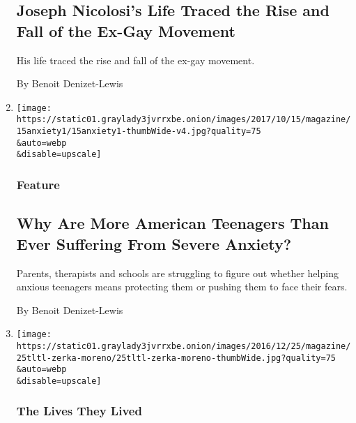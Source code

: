 \begin{enumerate}
  \hypertarget{joseph-nicolosis-life-traced-the-rise-and-fall-of-the-ex-gay-movement}{%
  \subsection{Joseph Nicolosi's Life Traced the Rise and Fall of the
  Ex-Gay
  Movement}\label{joseph-nicolosis-life-traced-the-rise-and-fall-of-the-ex-gay-movement}}

  His life traced the rise and fall of the ex-gay movement.

  By Benoit Denizet-Lewis
\item
  \href{/2017/10/11/magazine/why-are-more-american-teenagers-than-ever-suffering-from-severe-anxiety.html}{}

  \texttt{[image: https://static01.graylady3jvrrxbe.onion/images/2017/10/15/magazine/15anxiety1/15anxiety1-thumbWide-v4.jpg?quality=75\\\&auto=webp\\\&disable=upscale]}

  \hypertarget{feature-1}{%
  \subsubsection{Feature}\label{feature-1}}

  \hypertarget{why-are-more-american-teenagers-than-ever-suffering-from-severe-anxiety}{%
  \subsection{Why Are More American Teenagers Than Ever Suffering From
  Severe
  Anxiety?}\label{why-are-more-american-teenagers-than-ever-suffering-from-severe-anxiety}}

  Parents, therapists and schools are struggling to figure out whether
  helping anxious teenagers means protecting them or pushing them to
  face their fears.

  By Benoit Denizet-Lewis
\item
  \href{/interactive/2016/12/21/magazine/the-lives-they-lived-zerka-t-moreno.html}{}

  \texttt{[image: https://static01.graylady3jvrrxbe.onion/images/2016/12/25/magazine/25tltl-zerka-moreno/25tltl-zerka-moreno-thumbWide.jpg?quality=75\\\&auto=webp\\\&disable=upscale]}

  \hypertarget{the-lives-they-lived}{%
  \subsubsection{The Lives They Lived}\label{the-lives-they-lived}}


\end{enumerate}
